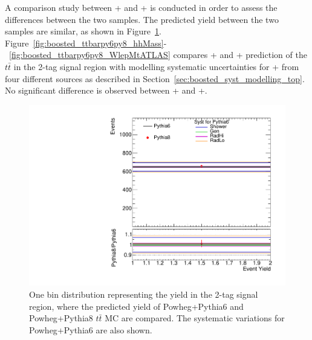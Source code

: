 A comparison study between \POWHEG+ and \POWHEG+ is conducted in order to assess the differences between the two 
samples. The predicted yield between the two samples are similar, as shown in Figure~\ref{fig:boosted_ttbarpy6py8_yield}. 
Figure~\ref{fig:boosted_ttbarpy6py8_hhMass}-~\ref{fig:boosted_ttbarpy6py8_WlepMtATLAS} 
compares \POWHEG+  and \POWHEG+ prediction of the $t\bar{t}$ in the 2-tag signal region with modelling systematic 
uncertainties for \POWHEG+  from four different sources as described in Section~\ref{sec:boosted_syst_modelling_top}. 
No significant difference is observed between \POWHEG+ and \POWHEG+.


\begin{figure}[!h]
\begin{center}
\includegraphics[scale=0.33]{./figures/boosted/TTBarPy6VsPy8/TTBarPy6VsPy8_SR_neventsweighted_all} 
\caption{One bin distribution representing the yield in the 2-tag signal region, where the predicted yield of Powheg+Pythia6 and Powheg+Pythia8 $t\bar{t}$ MC
are compared. The systematic variations for Powheg+Pythia6 are also shown.}
\label{fig:boosted_ttbarpy6py8_yield}
\end{center}
\end{figure}


